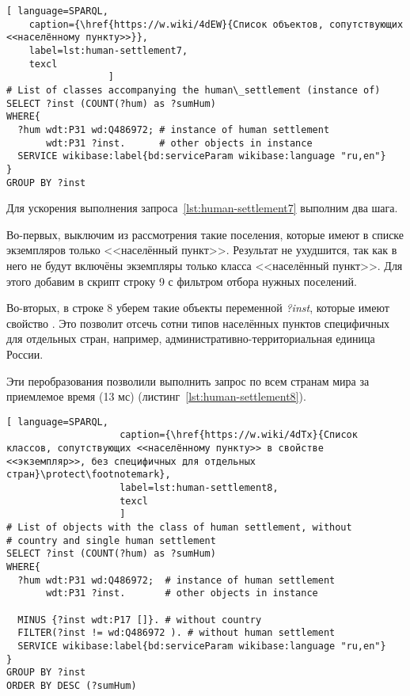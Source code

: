 \begin{lstlisting}[ language=SPARQL, 
    caption={\href{https://w.wiki/4dEW}{Cписок объектов, сопутствующих <<населённому пункту>>}},
    label=lst:human-settlement7,
    texcl 
                  ]
# List of classes accompanying the human\_settlement (instance of)
SELECT ?inst (COUNT(?hum) as ?sumHum) 
WHERE{          
  ?hum wdt:P31 wd:Q486972; # instance of human settlement
       wdt:P31 ?inst.      # other objects in instance
  SERVICE wikibase:label{bd:serviceParam wikibase:language "ru,en"}
}  
GROUP BY ?inst
\end{lstlisting}%

Для ускорения выполнения запроса~\ref{lst:human-settlement7} выполним два шага.
 
Во-первых, выключим из рассмотрения такие поселения, 
которые имеют в списке экземпляров только <<населённый пункт>>. 
Результат не ухудшится, так как в него не будут включёны экземпляры только класса <<населённый пункт>>. 
Для этого добавим в скрипт строку \num{9} с фильтром отбора нужных поселений.

Во-вторых, в строке \num{8} уберем такие объекты переменной \emph{?inst}, которые имеют свойство . Это позволит отсечь сотни типов населённых пунктов специфичных для отдельных стран, например, административно-территориальная единица России.

Эти перобразования позволили выполнить запрос по всем странам мира за приемлемое время (13 мс) (листинг~\ref{lst:human-settlement8}).

\lstset{numbers=left, firstnumber=1, frame=single}
\begin{lstlisting}[ language=SPARQL, 
                    caption={\href{https://w.wiki/4dTx}{Cписок классов, сопутствующих <<населённому пункту>> в свойстве <<экземпляр>>, без специфичных для отдельных стран}\protect\footnotemark},
                    label=lst:human-settlement8,
                    texcl 
                    ]
# List of objects with the class of human settlement, without 
# country and single human settlement
SELECT ?inst (COUNT(?hum) as ?sumHum) 
WHERE{ 
  ?hum wdt:P31 wd:Q486972;  # instance of human settlement
       wdt:P31 ?inst.       # other objects in instance
  
  MINUS {?inst wdt:P17 []}. # without country
  FILTER(?inst != wd:Q486972 ). # without human settlement
  SERVICE wikibase:label{bd:serviceParam wikibase:language "ru,en"}
}  
GROUP BY ?inst 
ORDER BY DESC (?sumHum)
\end{lstlisting}%

